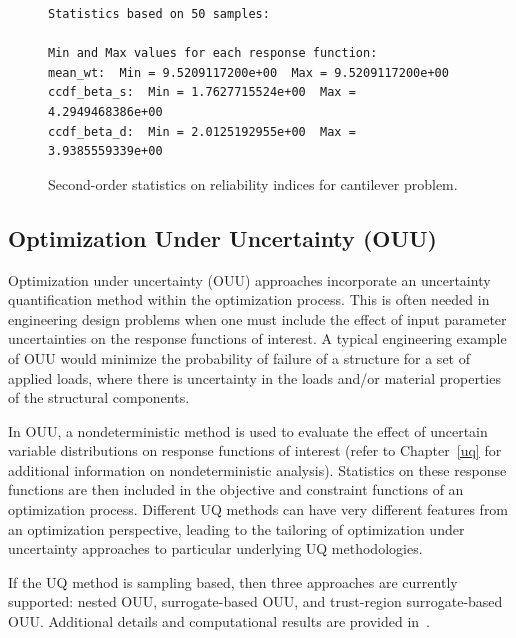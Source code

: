 \begin{figure}
\centering
\begin{bigbox}
\begin{small}
\begin{verbatim}
Statistics based on 50 samples:

Min and Max values for each response function:
mean_wt:  Min = 9.5209117200e+00  Max = 9.5209117200e+00
ccdf_beta_s:  Min = 1.7627715524e+00  Max = 4.2949468386e+00
ccdf_beta_d:  Min = 2.0125192955e+00  Max = 3.9385559339e+00

\end{verbatim}
\end{small}
\end{bigbox}
\caption{Second-order statistics on reliability indices for cantilever problem.}
\label{models:ex:2ndprob_res}
\end{figure}

\subsection{Optimization Under Uncertainty (OUU)} \label{models:ex:ouu}

Optimization under uncertainty (OUU) approaches incorporate an
uncertainty quantification method within the optimization
process. This is often needed in engineering design problems when one
must include the effect of input parameter uncertainties on the
response functions of interest. A typical engineering example of OUU
would minimize the probability of failure of a structure for a set of
applied loads, where there is uncertainty in the loads and/or material
properties of the structural components.

In OUU, a nondeterministic method is used to evaluate the effect of
uncertain variable distributions on response functions of interest
(refer to Chapter~\ref{uq} for additional information on
nondeterministic analysis). Statistics on these response functions are
then included in the objective and constraint functions of an
optimization process.  Different UQ methods can have very different
features from an optimization perspective, leading to the tailoring of
optimization under uncertainty approaches to particular underlying UQ
methodologies.

If the UQ method is sampling based, then three approaches are
currently supported: nested OUU, surrogate-based OUU, and trust-region
surrogate-based OUU.  Additional details and computational results are
provided in~\cite{Eld02}.

